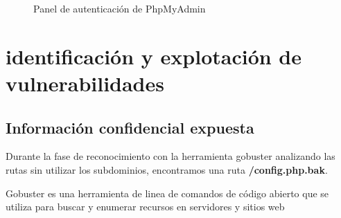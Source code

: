 \documentclass[a4paper]{article}
\begin{document}
\begin{figure}[H]
  \begin{center}
    \setlength{\fboxrule}{0.8pt}
    \caption{Panel de autenticación de PhpMyAdmin}
    \label{fig: Identifiedsubdomains}
  \end{center}
\end{figure}

\clearpage


  

\section{ identificación y explotación de vulnerabilidades }


\subsection{Información confidencial expuesta}

Durante la fase de reconocimiento con la herramienta gobuster analizando las rutas sin
utilizar los subdominios, encontramos una ruta \textbf{/config.php.bak}.\par
Gobuster es una herramienta de linea de comandos de código abierto que se utiliza para
buscar y enumerar recursos en servidores y sitios web 
\vspace{0.4cm}
\end{document}
